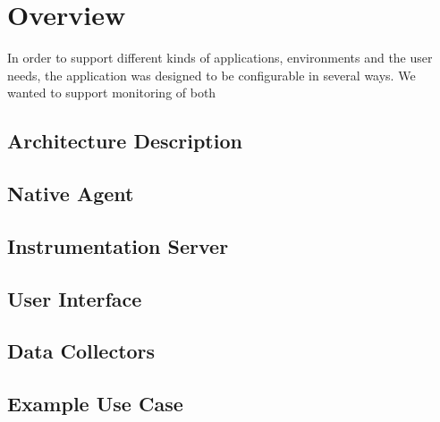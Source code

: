 \chapter{Overview}

In order to support different kinds of applications, environments and the user needs, the application was designed to be configurable in several ways. We wanted to support monitoring of both
\section{Architecture Description}
\section{Native Agent}
\section{Instrumentation Server}
\section{User Interface}
\section{Data Collectors}
\section{Example Use Case}